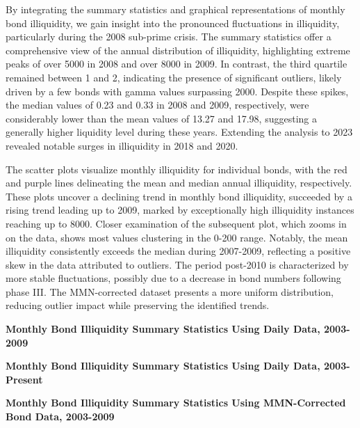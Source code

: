 \documentclass{article}
\newcommand*{\PathToOutput}{../output/}%
\begin{document}
By integrating the summary statistics and graphical representations of monthly bond illiquidity, we gain insight into the pronounced fluctuations in illiquidity, particularly during the 2008 sub-prime crisis. The summary statistics offer a comprehensive view of the annual distribution of illiquidity, highlighting extreme peaks of over 5000 in 2008 and over 8000 in 2009. In contrast, the third quartile remained between 1 and 2, indicating the presence of significant outliers, likely driven by a few bonds with gamma values surpassing 2000. Despite these spikes, the median values of 0.23 and 0.33 in 2008 and 2009, respectively, were considerably lower than the mean values of 13.27 and 17.98, suggesting a generally higher liquidity level during these years. Extending the analysis to 2023 revealed notable surges in illiquidity in 2018 and 2020.

The scatter plots visualize monthly illiquidity for individual bonds, with the red and purple lines delineating the mean and median annual illiquidity, respectively. These plots uncover a declining trend in monthly bond illiquidity, succeeded by a rising trend leading up to 2009, marked by exceptionally high illiquidity instances reaching up to 8000. Closer examination of the subsequent plot, which zooms in on the data, shows most values clustering in the 0-200 range. Notably, the mean illiquidity consistently exceeds the median during 2007-2009, reflecting a positive skew in the data attributed to outliers. The period post-2010 is characterized by more stable fluctuations, possibly due to a decrease in bond numbers following phase III. The MMN-corrected dataset presents a more uniform distribution, reducing outlier impact while preserving the identified trends.


\begin{table}[hbt!]
\centering
\textbf{\large Monthly Bond Illiquidity Summary Statistics Using Daily Data, 2003-2009}

\label{table:illiq_summary_paper}
\end{table}




\begin{table}[hbt!]
\centering
\textbf{\large Monthly Bond Illiquidity Summary Statistics Using Daily Data, 2003-Present}
\resizebox{\textwidth}{!}{%
    
}
\label{table: illiq_summary_new}
\end{table}




\begin{table}[hbt!]
\centering
\textbf{\large Monthly Bond Illiquidity Summary Statistics Using MMN-Corrected Bond Data, 2003-2009}

\label{table:illiq_daily_summary_mmn_paper}
\end{table}
\end{document}
